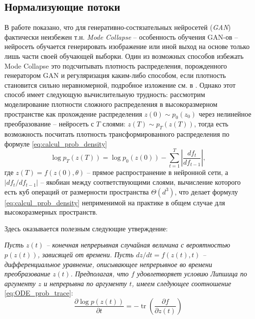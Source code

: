 \documentclass[]{scrartcl}
\newcommand{\tit}[1]{%
\textit{#1}%
}
\newcommand{\br}[1]{%
\left( #1 \right)%
}
\newcommand{\abs}[1]{%
\left| #1 \right| %
}
\DeclareMathOperator{\tr}{tr}
\begin{document}
\subsection{Нормализующие потоки}
В работе \cite{modecollapse} показано, что для генеративно-состязательных нейросетей (\textit{GAN}) фактически неизбежен т.н. \tit{Mode Collapse} -- особенность обучения GAN-ов -- нейросеть обучается генерировать изображение или иной выход на основе только лишь части своей обучающей выборки. Один из возможных способов избежать Mode Collapse это подсчитывать плотность распределения, порожденного генератором GAN и регуляризация каким-либо способом, если плотность становится сильно неравномерной, подробное изложение см. в \cite{normalizing_flows}. Однако этот способ имеет следующую вычислительную трудность: рассмотрим моделирование плотности сложного распределения в высокоразмерном пространстве как прохождение распределения $z(0) \sim p_0 (z_0)$ через нелинейное преобразование -- нейросеть с $T$ слоями: $z(T) \sim  p_T (z (T) )$, тогда есть возможность посчитать плотность трансформированного распределения по формуле \eqref{eq:calcul_prob_density} 
\begin{equation} \label{eq:calcul_prob_density}
\log p_T \br{ z(T) } = \log p_0 \br{ z(0) }  - \sum_{t=1}^T \abs{ \frac{ d f_t }{ d f_{t-1} } },
\end{equation}    
где $z(T) = f( z(0), \theta )$ -- прямое распространение в нейронной сети, а $ \abs{ d f_t / d f_{t-1}  } $ -- якобиан между соответствующими слоями, вычисление которого есть куб операций от размерности пространства $\Theta (d^3)$, что делает формулу \eqref{eq:calcul_prob_density} неприменимой на практике в общем случае для высокоразмерных пространств.

Здесь оказывается полезным следующие утверждение:

\tit{Пусть $z(t)$ -- конечная непрерывная случайная величина
с вероятностью  $p(z(t))$, зависящей от времени. Пусть $dz / dt = f(z(t), t)$ -- дифференциальное уравнение, описывающее непрерывное во времени преобразование $z(t)$. Предполагая, что $f$ удовлетворяет условию Липшица по аргументу  $z$ и непрерывна по аргументу $t$, имеем следующее соотношение} \eqref{eq:ODE_prob_trace}:
\begin{equation} \label{eq:ODE_prob_trace}
 \frac{\partial \log p \br{z(t)} }{\partial t } = - \tr \br{ \frac{\partial f }{ \partial z(t) }   }
 \end{equation} 
\end{document}
